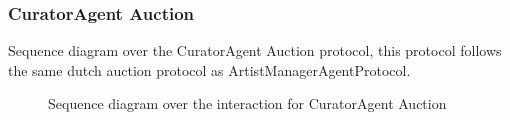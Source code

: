 \documentclass[paper=letter, fontsize=12pt]{article}
\begin{document}
\subsubsection{CuratorAgent Auction}
Sequence diagram over the CuratorAgent Auction protocol, this protocol follows the same dutch auction protocol as ArtistManagerAgentProtocol.
\begin{figure}[H]
  \begin{center}
    \caption{Sequence diagram over the interaction for CuratorAgent Auction}
    \label{fig:curator_auction_sequence}
  \end{center}
\end{figure}
\end{document}
